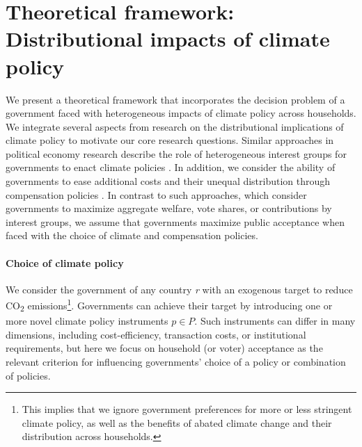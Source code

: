 \documentclass[12pt, a4paper]{article}
\begin{document}
\section{Theoretical framework: Distributional impacts of climate policy} \label{sec:literature}

We present a theoretical framework that incorporates the decision problem of a government faced with heterogeneous impacts of climate policy across households. We integrate several aspects from research on the distributional implications of climate policy to motivate our core research questions. Similar approaches in political economy research describe the role of heterogeneous interest groups for governments to enact climate policies \autocite{Aidt.1998,Fredriksson.1997}. In addition, we consider the ability of governments to ease additional costs and their unequal distribution through compensation policies \autocite{Lindbeck.1987,Aidt.2010,Cremer.2004}. In contrast to such approaches, which consider governments to maximize aggregate welfare, vote shares, or contributions by interest groups, we assume that governments maximize public acceptance \autocite[e.g.,][]{Downs.1957,Stigler.1971} when faced with the choice of climate and compensation policies. 

\paragraph{Choice of climate policy} 
We consider the government of any country \textit{r} with an exogenous target to reduce CO\textsubscript{2} emissions\footnote{This implies that we ignore government preferences for more or less stringent climate policy, as well as the benefits of abated climate change and their distribution across households.}. Governments can achieve their target by introducing one or more novel climate policy instruments $p \in P$. Such instruments can differ in many dimensions, including cost-efficiency, transaction costs, or institutional requirements, but here we focus on household (or voter) acceptance as the relevant criterion for influencing governments' choice of a policy or combination of policies.
\end{document}
